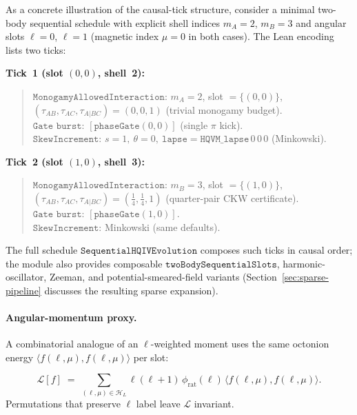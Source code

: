 \documentclass[11pt,a4paper]{article}
\theoremstyle{remark}
\begin{document}
\begin{examplebox}
As a concrete illustration of the causal-tick structure, consider a minimal two-body sequential schedule with explicit shell indices $m_A=2$, $m_B=3$ and angular slots $\ell=0$, $\ell=1$ (magnetic index $\mu=0$ in both cases). The Lean encoding lists two ticks:

\smallskip
\noindent\textbf{Tick~1 (slot $(0,0)$, shell~2):}
\begin{quote}
$\texttt{MonogamyAllowedInteraction}$: $m_A=2$, slot $=\{(0,0)\}$, 
$(\tau_{AB},\tau_{AC},\tau_{A|BC}) = (0,0,1)$ (trivial monogamy budget).\\
$\texttt{Gate burst}$: $[\texttt{phaseGate}(0,0)]$ (single $\pi$ kick).\\
$\texttt{SkewIncrement}$: $s=1,\ \theta=0,\ \texttt{lapse}=\texttt{HQVM\_lapse}\,0\,0\,0$ (Minkowski).
\end{quote}

\noindent\textbf{Tick~2 (slot $(1,0)$, shell~3):}
\begin{quote}
$\texttt{MonogamyAllowedInteraction}$: $m_B=3$, slot $=\{(1,0)\}$,
$(\tau_{AB},\tau_{AC},\tau_{A|BC}) = (\tfrac14,\tfrac14,1)$
(quarter-pair CKW certificate).\\
$\texttt{Gate burst}$: $[\texttt{phaseGate}(1,0)]$.\\
$\texttt{SkewIncrement}$: Minkowski (same defaults).
\end{quote}

\noindent The full schedule $\texttt{SequentialHQIVEvolution}$ composes such ticks in causal order; the module also provides composable $\texttt{twoBodySequentialSlots}$, harmonic-oscillator, Zeeman, and potential-smeared-field variants (Section~\ref{sec:sparse-pipeline} discusses the resulting sparse expansion).
\end{examplebox}

\paragraph{Angular-momentum proxy.}
A combinatorial analogue of an $\ell$-weighted moment uses the same octonion energy $\langle f(\ell,\mu),f(\ell,\mu)\rangle$ per slot:

\begin{equation}
  \mathcal{L}[f] \;=\; \sum_{(\ell,\mu)\in\mathcal{H}_L}
    \ell(\ell+1)\,\phi_{\mathrm{rat}}(\ell)\,\langle f(\ell,\mu),f(\ell,\mu)\rangle.
\end{equation}
Permutations that preserve $\ell$ label leave $\mathcal{L}$ invariant.
\end{document}
